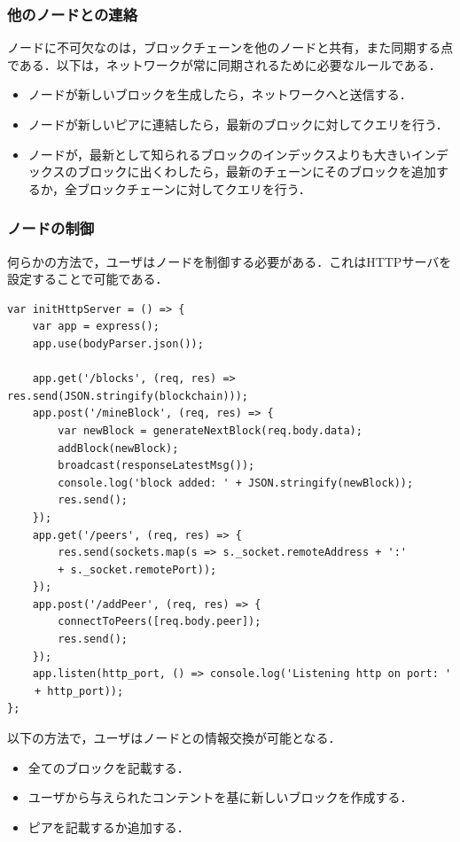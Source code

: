 \newpage

\subsubsection{他のノードとの連絡}
ノードに不可欠なのは，ブロックチェーンを他のノードと共有，また同期する点である．以下は，ネットワークが常に同期されるために必要なルールである．

\begin{itemize}
\item ノードが新しいブロックを生成したら，ネットワークへと送信する．
\item ノードが新しいピアに連結したら，最新のブロックに対してクエリを行う．
\item ノードが，最新として知られるブロックのインデックスよりも大きいインデックスのブロックに出くわしたら，最新のチェーンにそのブロックを追加するか，全ブロックチェーンに対してクエリを行う．
\end{itemize}

\subsubsection{ノードの制御}
何らかの方法で，ユーザはノードを制御する必要がある．これはHTTPサーバを設定することで可能である．

\begin{verbatim}
var initHttpServer = () => {
    var app = express();
    app.use(bodyParser.json());
 
    app.get('/blocks', (req, res) => res.send(JSON.stringify(blockchain)));
    app.post('/mineBlock', (req, res) => {
        var newBlock = generateNextBlock(req.body.data);
        addBlock(newBlock);
        broadcast(responseLatestMsg());
        console.log('block added: ' + JSON.stringify(newBlock));
        res.send();
    });
    app.get('/peers', (req, res) => {
        res.send(sockets.map(s => s._socket.remoteAddress + ':' 
        + s._socket.remotePort));
    });
    app.post('/addPeer', (req, res) => {
        connectToPeers([req.body.peer]);
        res.send();
    });
    app.listen(http_port, () => console.log('Listening http on port: '
　　 + http_port));
};
\end{verbatim}

\newpage

以下の方法で，ユーザはノードとの情報交換が可能となる．

\begin{itemize}
\item 全てのブロックを記載する．
\item ユーザから与えられたコンテントを基に新しいブロックを作成する．
\item ピアを記載するか追加する．
\end{itemize}

